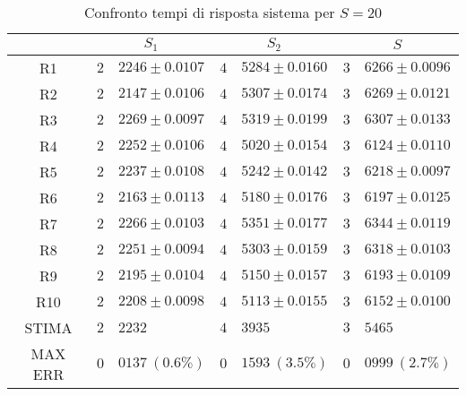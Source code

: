 \begin{table}[!h]
\begin{tabular}{c|r@{.}l|r@{.}l|r@{.}l}
& \multicolumn{2}{|c|}{$S_1$}
& \multicolumn{2}{|c|}{$S_2$}
& \multicolumn{2}{|c}{$S$} 
\\          
\hline
R1      & $2$&$2246 \pm 0.0107$ & $4$&$5284 \pm 0.0160$ & $3$&$6266 \pm 0.0096$ \\
R2      & $2$&$2147 \pm 0.0106$ & $4$&$5307 \pm 0.0174$ & $3$&$6269 \pm 0.0121$ \\
R3      & $2$&$2269 \pm 0.0097$ & $4$&$5319 \pm 0.0199$ & $3$&$6307 \pm 0.0133$ \\
R4      & $2$&$2252 \pm 0.0106$ & $4$&$5020 \pm 0.0154$ & $3$&$6124 \pm 0.0110$ \\
R5      & $2$&$2237 \pm 0.0108$ & $4$&$5242 \pm 0.0142$ & $3$&$6218 \pm 0.0097$ \\
R6      & $2$&$2163 \pm 0.0113$ & $4$&$5180 \pm 0.0176$ & $3$&$6197 \pm 0.0125$ \\
R7      & $2$&$2266 \pm 0.0103$ & $4$&$5351 \pm 0.0177$ & $3$&$6344 \pm 0.0119$ \\
R8      & $2$&$2251 \pm 0.0094$ & $4$&$5303 \pm 0.0159$ & $3$&$6318 \pm 0.0103$ \\
R9      & $2$&$2195 \pm 0.0104$ & $4$&$5150 \pm 0.0157$ & $3$&$6193 \pm 0.0109$ \\
R10     & $2$&$2208 \pm 0.0098$ & $4$&$5113 \pm 0.0155$ & $3$&$6152 \pm 0.0100$ \\
STIMA   & $2$&$2232$            & $4$&$3935$            & $3$&$5465$            \\
MAX ERR & $0$&$0137 \ (0.6\%)$  & $0$&$1593 \ (3.5\%)$  & $0$&$0999 \ (2.7\%)$    
\end{tabular}
\centering
\caption{Confronto tempi di risposta sistema per $S=20$}
\label{tab:20_s}
\end{table}
